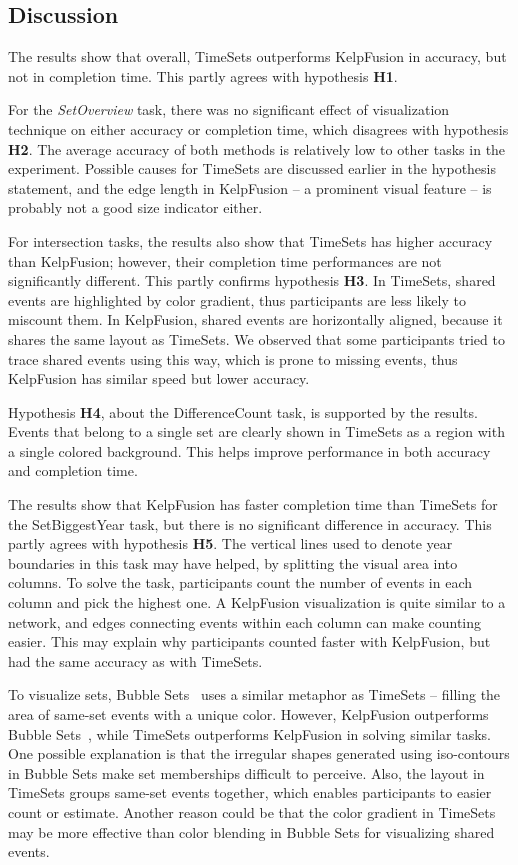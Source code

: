\subsection{Discussion}
The results show that overall, TimeSets outperforms KelpFusion in accuracy, but not in completion time. This partly agrees with hypothesis \textbf{H1}.

For the \emph{SetOverview} task, there was no significant effect of visualization technique on either accuracy or completion time, which disagrees with hypothesis \textbf{H2}. The average accuracy of both methods is relatively low to other tasks in the experiment. Possible causes for TimeSets are discussed earlier in the hypothesis statement, and the edge length in KelpFusion -- a prominent visual feature -- is probably not a good size indicator either.

For intersection tasks, the results also show that TimeSets has higher accuracy than KelpFusion; however, their completion time performances are not significantly different. This partly confirms hypothesis \textbf{H3}. In TimeSets, shared events are highlighted by color gradient, thus participants are less likely to miscount them. In KelpFusion, shared events are horizontally aligned, because it shares the same layout as TimeSets. We observed that some participants tried to trace shared events using this way, which is prone to missing events, thus KelpFusion has similar speed but lower accuracy.

Hypothesis \textbf{H4}, about the DifferenceCount task, is supported by the results. Events that belong to a single set are clearly shown in TimeSets as a region with a single colored background. This helps improve performance in both accuracy and completion time.

The results show that KelpFusion has faster completion time than TimeSets for the SetBiggestYear task, but there is no significant difference in accuracy. This partly agrees with hypothesis \textbf{H5}. The vertical lines used to denote year boundaries in this task may have helped, by splitting the visual area into columns. To solve the task, participants count the number of events in each column and pick the highest one. A KelpFusion visualization is quite similar to a network, and edges connecting events within each column can make counting easier. This may explain why participants counted faster with KelpFusion, but had the same accuracy as with TimeSets.

To visualize sets, Bubble Sets~\cite{Collins2009a} uses a similar metaphor as TimeSets -- filling the area of same-set events with a unique color. However, KelpFusion outperforms Bubble Sets~\cite{Meulemans2013}, while TimeSets outperforms KelpFusion in solving similar tasks. One possible explanation is that the irregular shapes generated using iso-contours in Bubble Sets make set memberships difficult to perceive. Also, the layout in TimeSets groups same-set events together, which enables participants to easier count or estimate. Another reason could be that the color gradient in TimeSets may be more effective than color blending in Bubble Sets for visualizing shared events.

